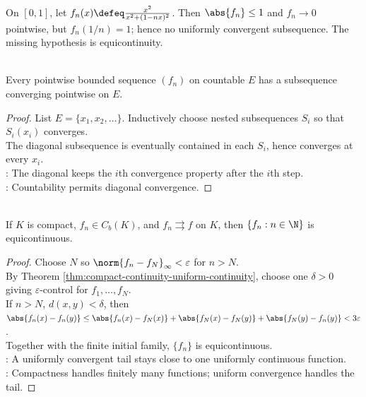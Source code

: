 \begin{example} \label{ex:uniform-boundedness-without-uniform-subsequence} \\
On $[0,1]$, let $f_n(x)\defeq \frac{x^2}{x^2+(1-nx)^2}$. Then $\abs{f_n}\leq1$ and $f_n\to0$ pointwise, but $f_n(1/n)=1$; hence no uniformly convergent subsequence. The missing hypothesis is equicontinuity.
\end{example}

\begin{theorem} \label{thm:diagonal-selection-countable-pointwise} \\
Every pointwise bounded sequence $(f_n)$ on countable $E$ has a subsequence converging pointwise on $E$.
\begin{proof}
List $E=\{x_1,x_2,\ldots\}$. Inductively choose nested subsequences $S_i$ so that $S_i(x_i)$ converges.\\
The diagonal subsequence is eventually contained in each $S_i$, hence converges at every $x_i$.\\
: The diagonal keeps the $i$th convergence property after the $i$th step.\\
: Countability permits diagonal convergence.
\end{proof}
\end{theorem}

\begin{theorem} \label{thm:uniform-convergence-implies-equicontinuity-on-compact} \\
If $K$ is compact, $f_n\in C_b(K)$, and $f_n\rightrightarrows f$ on $K$, then $\{f_n:n\in\N\}$ is equicontinuous.
\begin{proof}
Choose $N$ so $\norm{f_n-f_N}_{\infty}<\varepsilon$ for $n>N$.\\
By Theorem \ref{thm:compact-continuity-uniform-continuity}, choose one $\delta>0$ giving $\varepsilon$-control for $f_1,\ldots,f_N$.\\
If $n>N$, $d(x,y)<\delta$, then $\abs{f_n(x)-f_n(y)} \leq \abs{f_n(x)-f_N(x)}+\abs{f_N(x)-f_N(y)}+\abs{f_N(y)-f_n(y)}<3\varepsilon$.\\
Together with the finite initial family, $\{f_n\}$ is equicontinuous.\\
: A uniformly convergent tail stays close to one uniformly continuous function.\\
: Compactness handles finitely many functions; uniform convergence handles the tail.
\end{proof}
\end{theorem}

